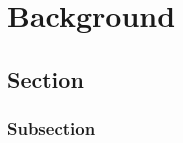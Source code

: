 
\chapter{Background}\label{chapter:background}
\cite{latex}
\section{Section}

\subsection{Subsection}

